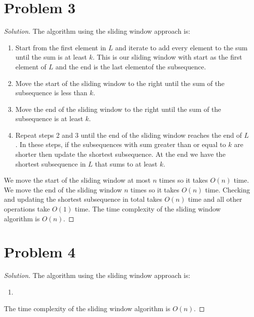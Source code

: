 \documentclass[12pt]{article}
\newenvironment*{solution}{\begin{proof}[Solution]}{\end{proof}}
\begin{document}
\section*{Problem 3}
\begin{solution}
    The algorithm using the sliding window approach is:
    \begin{enumerate}
        \item Start from the first element in \(L\) and iterate to add every
        element to the sum until the sum is at least \(k\). This is our
        sliding window with start as the first element of \(L\) and the end is
        the last elementof the subsequence.
        \item Move the start of the sliding window to the right until the sum
        of the subsequence is less than \(k\).
        \item Move the end of the sliding window to the right until the sum of
        the subsequence is at least \(k\).
        \item Repeat steps 2 and 3 until the end of the sliding window reaches
        the end of \(L\). In these steps, if the subsequences with sum greater
        than or equal to \(k\) are shorter then update the shortest
        subsequence. At the end we have the shortest subsequence in \(L\) that
        sums to at least \(k\).
    \end{enumerate}
    We move the start of the sliding window at most \(n\) times so it takes
    \(O(n)\) time. We move the end of the sliding window \(n\) times so it
    takes \(O(n)\) time. Checking and updating the shortest subsequence in
    total takes \(O(n)\) time and all other operations take \(O(1)\) time. The
    time complexity of the sliding window algorithm is \(O(n)\).
\end{solution}
\section*{Problem 4}
\begin{solution}
    The algorithm using the sliding window approach is:
    \begin{enumerate}
        \item
    \end{enumerate}
    The time complexity of the sliding window algorithm is \(O(n)\).
\end{solution}
\end{document}
